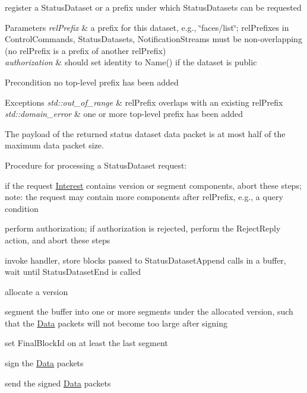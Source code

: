 register a Status\+Dataset or a prefix under which Status\+Datasets can be requested 


\begin{DoxyParams}{Parameters}
{\em rel\+Prefix} & a prefix for this dataset, e.\+g., \char`\"{}faces/list\char`\"{}; rel\+Prefixes in Control\+Commands, Status\+Datasets, Notification\+Streams must be non-\/overlapping (no rel\+Prefix is a prefix of another rel\+Prefix) \\
\hline
{\em authorization} & should set identity to Name() if the dataset is public \\
\hline
\end{DoxyParams}
\begin{DoxyPrecond}{Precondition}
no top-\/level prefix has been added 
\end{DoxyPrecond}

\begin{DoxyExceptions}{Exceptions}
{\em std\+::out\+\_\+of\+\_\+range} & {\ttfamily rel\+Prefix} overlaps with an existing rel\+Prefix \\
\hline
{\em std\+::domain\+\_\+error} & one or more top-\/level prefix has been added\\
\hline
\end{DoxyExceptions}
The payload of the returned status dataset data packet is at most half of the maximum data packet size.

Procedure for processing a Status\+Dataset request\+:
\begin{DoxyEnumerate}
\item if the request \hyperlink{classndn_1_1Interest}{Interest} contains version or segment components, abort these steps; note\+: the request may contain more components after rel\+Prefix, e.\+g., a query condition
\item perform authorization; if authorization is rejected, perform the Reject\+Reply action, and abort these steps
\item invoke handler, store blocks passed to Status\+Dataset\+Append calls in a buffer, wait until Status\+Dataset\+End is called
\item allocate a version
\item segment the buffer into one or more segments under the allocated version, such that the \hyperlink{classndn_1_1Data}{Data} packets will not become too large after signing
\item set Final\+Block\+Id on at least the last segment
\item sign the \hyperlink{classndn_1_1Data}{Data} packets
\item send the signed \hyperlink{classndn_1_1Data}{Data} packets
\end{DoxyEnumerate}

